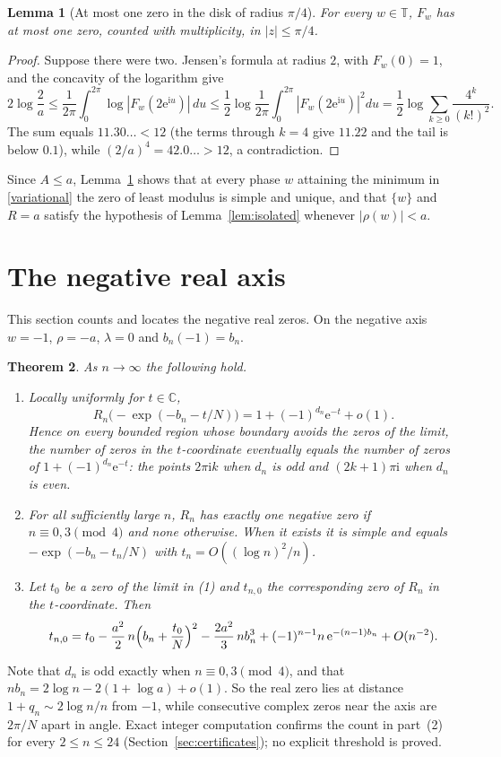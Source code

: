 \documentclass[11pt,a4paper]{article}
\newtheorem{theorem}{Theorem}
\newtheorem{lemma}[theorem]{Lemma}
\theoremstyle{remark}
\newcommand{\T}{\mathbb T}
\newcommand{\e}{\mathrm e}
\newcommand{\ii}{\mathrm i}
\begin{document}
\begin{lemma}[At most one zero in the disk of radius $\pi/4$]\label{lem:jensen}
For every $w\in\T$, $F_w$ has at most one zero, counted with multiplicity, in $|z|\le\pi/4$.
\end{lemma}
\begin{proof}
Suppose there were two. Jensen's formula at radius $2$, with $F_w(0)=1$, and the concavity of the logarithm give
\[
2\log\frac2a\le\frac1{2\pi}\int_0^{2\pi}\log|F_w(2\e^{\ii u})|\,du\le\frac12\log\frac1{2\pi}\int_0^{2\pi}|F_w(2\e^{\ii u})|^2du=\frac12\log\sum_{k\ge0}\frac{4^k}{(k!)^2}.
\]
The sum equals $11.30\ldots<12$ (the terms through $k=4$ give $11.22$ and the tail is below $0.1$), while $(2/a)^4=42.0\ldots>12$, a contradiction.
\end{proof}
Since $A\le a$, Lemma~\ref{lem:jensen} shows that at every phase $w$ attaining the minimum in \eqref{variational} the zero of least modulus is simple and unique, and that $\{w\}$ and $R=a$ satisfy the hypothesis of Lemma~\ref{lem:isolated} whenever $|\rho(w)|<a$.

\section{The negative real axis}\label{sec:negative}
This section counts and locates the negative real zeros. On the negative axis $w=-1$, $\rho=-a$, $\lambda=0$ and $b_n(-1)=b_n$.

\begin{theorem}\label{thm:negative}
As $n\to\infty$ the following hold.
\begin{enumerate}
\item Locally uniformly for $t\in\mathbb C$,
\[
R_n\bigl(-\exp(-b_n-t/N)\bigr)=1+(-1)^{d_n}\e^{-t}+o(1).
\]
Hence on every bounded region whose boundary avoids the zeros of the limit, the number of zeros in the $t$-coordinate eventually equals the number of zeros of $1+(-1)^{d_n}\e^{-t}$: the points $2\pi\ii k$ when $d_n$ is odd and $(2k+1)\pi\ii$ when $d_n$ is even.
\item For all sufficiently large $n$, $R_n$ has exactly one negative zero if $n\equiv0,3\pmod4$ and none otherwise. When it exists it is simple and equals $-\exp(-b_n-t_n/N)$ with $t_n=O((\log n)^2/n)$.
\item Let $t_0$ be a zero of the limit in (1) and $t_{n,0}$ the corresponding zero of $R_n$ in the $t$-coordinate. Then
\begin{equation}\label{correct}
t_{n,0}=t_0-\frac{a^2}{2}\,n\Bigl(b_n+\frac{t_0}{N}\Bigr)^2-\frac{2a^2}{3}\,nb_n^3+(-1)^{n-1}n\,\e^{-(n-1)b_n}+O(n^{-2}).
\end{equation}
\end{enumerate}
\end{theorem}
Note that $d_n$ is odd exactly when $n\equiv0,3\pmod 4$, and that $nb_n=2\log n-2(1+\log a)+o(1)$. So the real zero lies at distance $1+q_n\sim2\log n/n$ from $-1$, while consecutive complex zeros near the axis are $2\pi/N$ apart in angle. Exact integer computation confirms the count in part~(2) for every $2\le n\le24$ (Section~\ref{sec:certificates}); no explicit threshold is proved.
\end{document}

